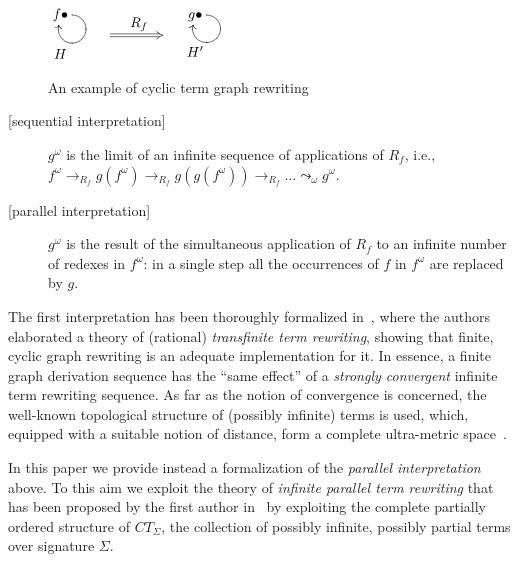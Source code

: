 \documentclass{eptcs}
\theoremstyle{plain}
\theoremstyle{definition}
\begin{document}
\begin{figure}
\centering
$
\SelectTips{cm}{}
\xymatrix@=1ex{
f \bullet \ar `r[d] `[] `[] []& \mbox{ } \\
\mbox{ } &  \\
H\\}
$
\hspace{1cm}
$
\xymatrix@=2ex{
& \\
\mbox{ }\ar@{=>}[rrr]^{\mbox{ $R_f$}} & & & \mbox{ } \\
& \\
}
$
\hspace{1cm}
$
\SelectTips{cm}{}
\xymatrix@=1ex{
g \bullet \ar `r[d] `[] `[] []& \mbox{ } \\
\mbox{ } & \\
H'\\}
$
\caption[ ]{An example of cyclic term graph rewriting}
\label{fi:term-graph-2}
\end{figure}

\begin{description}
\item[{[sequential interpretation]}]
$g^\omega$ is the limit of an infinite sequence of applications of
$R_f$, i.e., $f^\omega \rightarrow_{R_f} g(f^\omega) \rightarrow_{R_f}
g(g(f^\omega)) \rightarrow_{R_f}\ldots \leadsto_\omega g^\omega$.

\item[{[parallel interpretation]}]
$g^\omega$ is the result of the simultaneous application of $R_f$
to an infinite number of redexes in $f^\omega$: in a single step all
the occurrences of $f$ in $f^\omega$ are replaced by $g$.
\end{description}

\noindent
The first interpretation has been thoroughly formalized in~\cite{DK:RRRR,DKP:INFP,FRW:CPCR,FW:RCTG,KKSV:AGRS}, where the authors
elaborated a theory of (rational) \emph{transfinite term rewriting},
showing that finite, cyclic graph rewriting is an adequate
implementation for it. In essence, a finite graph derivation sequence
has the ``same effect'' of a \emph{strongly convergent} infinite
term rewriting sequence. As far as the notion of convergence is
concerned, the well-known topological structure of (possibly infinite)
terms is used, which, equipped with a suitable notion of distance,
form a complete ultra-metric space~\cite{AN:MSIT}.

In this paper we provide instead a formalization of the \emph{parallel
interpretation} above. To this aim we exploit the theory of \emph{infinite
parallel term rewriting} that has been proposed by the first author
in~\cite{Cor:TRC} 
by exploiting the complete partially ordered structure of
$CT_\Sigma$, the collection of possibly infinite, possibly partial
terms over signature $\Sigma$.
\end{document}
